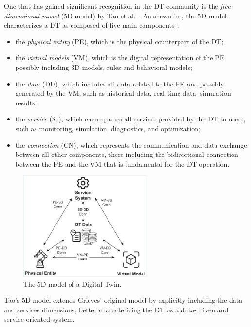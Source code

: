 One that has gained significant recognition in the \ac{DT} community is the \emph{five-dimensional model} (5D model) by Tao et al.~\cite{dt-driven-prognostics-tao-2018}.
%
As shown in , the 5D model characterizes a \ac{DT} as composed of five main components~\cite{qi2021enablingtechdt}:
\begin{itemize}
\item the \emph{physical entity} (PE), which is the physical counterpart of the \ac{DT};
\item the \emph{virtual models} (VM), which is the digital representation of the PE possibly including 3D models, rules and behavioral models;
\item the \emph{data} (DD), which includes all data related to the PE and possibly generated by the VM, such as historical data, real-time data, simulation results;
\item the \emph{service} (Ss), which encompasses all services provided by the \ac{DT} to users, such as monitoring, simulation, diagnostics, and optimization;
\item the \emph{connection} (CN), which represents the communication and data exchange between all other components, there including the bidirectional connection between the PE and the VM that is fundamental for the \ac{DT} operation.
\end{itemize}

\begin{figure}[t]
    \centering
    \includegraphics[width=0.6\textwidth]{figures/5d-model.pdf}
    \caption{The 5D model of a Digital Twin.}
    \label{fig:dt-5d-model}
\end{figure}

Tao's 5D model extends Grieves' original model by explicitly including the data and services dimensions, better characterizing the \ac{DT} as a data-driven and service-oriented system. 


